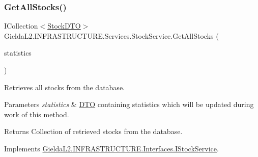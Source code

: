 \mbox{\label{class_gielda_l2_1_1_i_n_f_r_a_s_t_r_u_c_t_u_r_e_1_1_services_1_1_stock_service_a1923e787cf70d1442d2108c064087202}} 
\subsubsection{\texorpdfstring{GetAllStocks()}{GetAllStocks()}}
{\footnotesize\ttfamily I\+Collection$<$\mbox{\hyperlink{class_gielda_l2_1_1_i_n_f_r_a_s_t_r_u_c_t_u_r_e_1_1_d_t_o_1_1_stock_d_t_o}{Stock\+D\+TO}}$>$ Gielda\+L2.\+I\+N\+F\+R\+A\+S\+T\+R\+U\+C\+T\+U\+R\+E.\+Services.\+Stock\+Service.\+Get\+All\+Stocks (\begin{DoxyParamCaption}\item[{\mbox{\hyperlink{class_gielda_l2_1_1_i_n_f_r_a_s_t_r_u_c_t_u_r_e_1_1_d_t_o_1_1_statistics_d_t_o}{Statistics\+D\+TO}}}]{statistics }\end{DoxyParamCaption})}



Retrieves all stocks from the database. 


\begin{DoxyParams}{Parameters}
{\em statistics} & \mbox{\hyperlink{namespace_gielda_l2_1_1_i_n_f_r_a_s_t_r_u_c_t_u_r_e_1_1_d_t_o}{D\+TO}} containing statistics which will be updated during work of this method.\\
\hline
\end{DoxyParams}
\begin{DoxyReturn}{Returns}
Collection of retrieved stocks from the database.
\end{DoxyReturn}


Implements \mbox{\hyperlink{interface_gielda_l2_1_1_i_n_f_r_a_s_t_r_u_c_t_u_r_e_1_1_interfaces_1_1_i_stock_service_ae94c4404091898a36f0d5eafa5b0b7d9}{Gielda\+L2.\+I\+N\+F\+R\+A\+S\+T\+R\+U\+C\+T\+U\+R\+E.\+Interfaces.\+I\+Stock\+Service}}.

\mbox{\label{class_gielda_l2_1_1_i_n_f_r_a_s_t_r_u_c_t_u_r_e_1_1_services_1_1_stock_service_ae8c734f66dfb438f446422df01ec994e}} 
